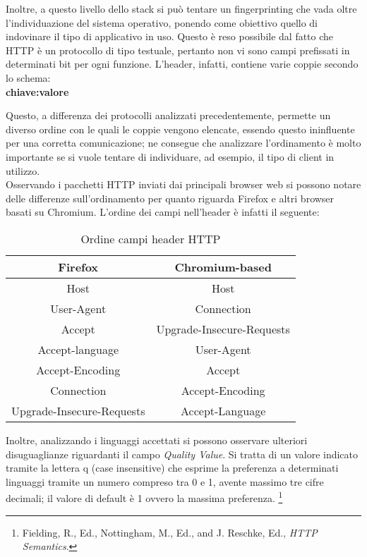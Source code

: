 Inoltre, a questo livello dello stack si può tentare un fingerprinting che vada oltre l'individuazione del sistema operativo, ponendo come obiettivo quello di indovinare il tipo di applicativo in uso.
Questo è reso possibile dal fatto che HTTP è un protocollo di tipo testuale, pertanto non vi sono campi prefissati in determinati bit per ogni funzione.
L'header, infatti, contiene varie coppie secondo lo schema:\\
\textbf{chiave:valore} 


Questo, a differenza dei protocolli analizzati precedentemente, permette un diverso ordine con le quali le coppie vengono elencate, essendo questo ininfluente per una corretta comunicazione; ne consegue che analizzare l'ordinamento è molto importante se si vuole tentare di individuare, ad esempio, il tipo di client in utilizzo.\\

Osservando i pacchetti HTTP inviati dai principali browser web si possono notare delle differenze sull'ordinamento per quanto riguarda Firefox e altri browser basati su Chromium.
L'ordine dei campi nell'header è infatti il seguente:

\begin{table}[h]
	\centering
	\begin{tabular}{| c | c |}
		\hline
		\textbf{Firefox} & \textbf{Chromium-based}
		\\
		\hline
		Host & Host
		\\
		\hline
		User-Agent & Connection
		\\
		\hline
		Accept & Upgrade-Insecure-Requests
		\\
		\hline
		Accept-language & User-Agent
		\\
		\hline
		Accept-Encoding & Accept
		\\
		\hline
		Connection & Accept-Encoding
		\\
		\hline
		Upgrade-Insecure-Requests & Accept-Language
		\\
		\hline
	\end{tabular}
	\caption{Ordine campi header HTTP}
	\label{tab:ordineHTTP}
\end{table}

Inoltre, analizzando i linguaggi accettati si possono osservare ulteriori disuguaglianze riguardanti il campo \textit{Quality Value}.
Si tratta di un valore indicato tramite la lettera q (case insensitive) che esprime la preferenza a determinati linguaggi tramite un numero compreso tra 0 e 1, avente massimo tre cifre decimali; il valore di default è 1 ovvero la massima preferenza. \footnote{Fielding, R., Ed., Nottingham, M., Ed., and J. Reschke, Ed., \textit{HTTP Semantics}.} 

